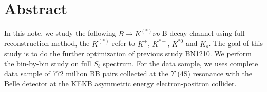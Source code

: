 
\chapter*{Abstract}
In this note, we study the following $B \rightarrow K^{(*)} \nu \bar{\nu}$ B decay channel using full reconstruction method, the $K^{(*)}$ refer to $K^+$, $K^{*+}$, $K^{*0}$ and $K_s$. The goal of this study is to do the further optimization of previous study BN1210\cite{ref:Neubauer2011}. We perform the bin-by-bin study on full $S_b$ spectrum. For the data sample, we uses complete data sample of 772 million BB pairs collected at the $\Upsilon$ (4S) resonance with the Belle detector at the KEKB asymmetric energy electron-positron collider.
 \cleardoublepage



